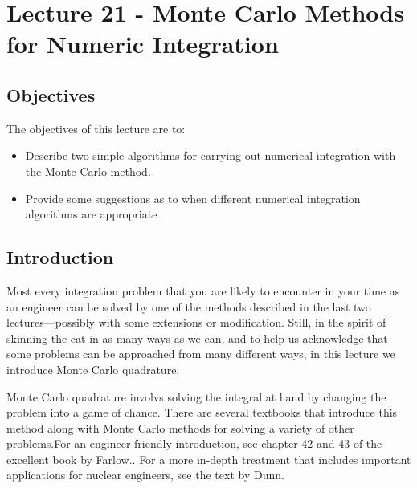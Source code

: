 \chapter{Lecture 21 - Monte Carlo Methods for Numeric Integration}
\label{ch:lec21n}
\section{Objectives}
The objectives of this lecture are to:
\begin{itemize}
\item Describe two simple algorithms for carrying out numerical integration with the Monte Carlo method.
\item Provide some suggestions as to when different numerical integration algorithms are appropriate
\end{itemize}
\setcounter{lstannotation}{0}
\section{Introduction}
Most every integration problem that you are likely to encounter in your time as an engineer can be solved by one of the methods described in the last two lectures---possibly with some extensions or modification.  Still, in the spirit of skinning the cat in as many ways as we can, and to help us acknowledge that some problems can be approached from many different ways, in this lecture we introduce Monte Carlo quadrature.

Monte Carlo quadrature involvs solving the integral at hand by changing the problem into a game of chance.  There are several textbooks that introduce this method along with Monte Carlo methods for solving a variety of other problems.For an engineer-friendly introduction, see chapter 42 and 43 of the excellent book by Farlow.\cite{farlow1993partial}.  For a more in-depth treatment that includes important applications for nuclear engineers, see the text by Dunn.\cite{dunn2022exploring}

